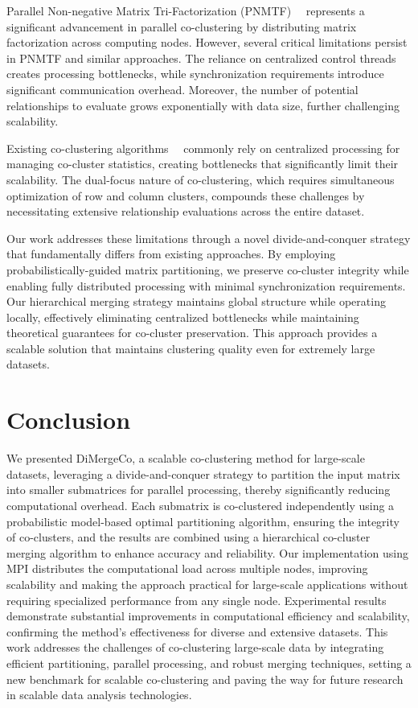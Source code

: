 \documentclass[journal]{IEEEtran}
\renewcommand{\cite}[1]{~\autocite{#1}}
\begin{document}
Parallel Non-negative Matrix Tri-Factorization (PNMTF)~\cite{chen2023ParallelNonNegativeMatrix} represents a significant advancement in parallel co-clustering by distributing matrix factorization across computing nodes. However, several critical limitations persist in PNMTF and similar approaches. The reliance on centralized control threads creates processing bottlenecks, while synchronization requirements introduce significant communication overhead. Moreover, the number of potential relationships to evaluate grows exponentially with data size, further challenging scalability.

Existing co-clustering algorithms~\cite{chen2023ParallelNonNegativeMatrix, cheng2015CoClusterDDistributedFramework} commonly rely on centralized processing for managing co-cluster statistics, creating bottlenecks that significantly limit their scalability. The dual-focus nature of co-clustering, which requires simultaneous optimization of row and column clusters, compounds these challenges by necessitating extensive relationship evaluations across the entire dataset.

Our work addresses these limitations through a novel divide-and-conquer strategy that fundamentally differs from existing approaches. By employing probabilistically-guided matrix partitioning, we preserve co-cluster integrity while enabling fully distributed processing with minimal synchronization requirements. Our hierarchical merging strategy maintains global structure while operating locally, effectively eliminating centralized bottlenecks while maintaining theoretical guarantees for co-cluster preservation. This approach provides a scalable solution that maintains clustering quality even for extremely large datasets.



\section{Conclusion}
\label{sec:conclusion}
We presented DiMergeCo, a scalable co-clustering method for large-scale datasets, leveraging a divide-and-conquer strategy to partition the input matrix into smaller submatrices for parallel processing, thereby significantly reducing computational overhead. Each submatrix is co-clustered independently using a probabilistic model-based optimal partitioning algorithm, ensuring the integrity of co-clusters, and the results are combined using a hierarchical co-cluster merging algorithm to enhance accuracy and reliability. Our implementation using MPI distributes the computational load across multiple nodes, improving scalability and making the approach practical for large-scale applications without requiring specialized performance from any single node. Experimental results demonstrate substantial improvements in computational efficiency and scalability, confirming the method's effectiveness for diverse and extensive datasets. This work addresses the challenges of co-clustering large-scale data by integrating efficient partitioning, parallel processing, and robust merging techniques, setting a new benchmark for scalable co-clustering and paving the way for future research in scalable data analysis technologies.
\end{document}
